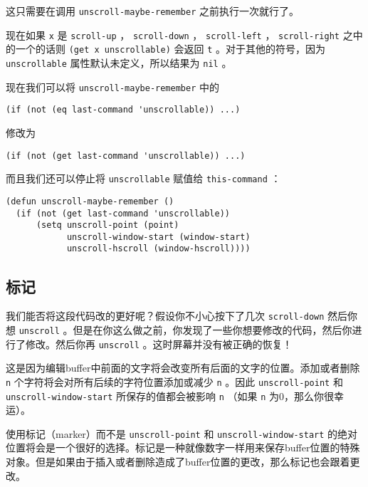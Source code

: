 这只需要在调用 \texttt{unscroll-maybe-remember} 之前执行一次就行了。

现在如果 \texttt{x} 是 \texttt{scroll-up} ， \texttt{scroll-down} ， \texttt{scroll-left} ， \texttt{scroll-right} 之中的一个的话则 \texttt{(get x unscrollable)} 会返回 \texttt{t} 。对于其他的符号，因为 \texttt{unscrollable} 属性默认未定义，所以结果为 \texttt{nil} 。

现在我们可以将 \texttt{unscroll-maybe-remember} 中的

\begin{verbatim}
(if (not (eq last-command 'unscrollable)) ...)
\end{verbatim}

修改为

\begin{verbatim}
(if (not (get last-command 'unscrollable)) ...)
\end{verbatim}

而且我们还可以停止将 \texttt{unscrollable} 赋值给 \texttt{this-command} ：

\begin{verbatim}
(defun unscroll-maybe-remember ()
  (if (not (get last-command 'unscrollable))
      (setq unscroll-point (point)
            unscroll-window-start (window-start)
            unscroll-hscroll (window-hscroll))))
\end{verbatim}

\subsection{标记}
\label{section:03-Markers}

我们能否将这段代码改的更好呢？假设你不小心按下了几次 \texttt{scroll-down} 然后你想 \texttt{unscroll} 。但是在你这么做之前，你发现了一些你想要修改的代码，然后你进行了修改。然后你再 \texttt{unscroll} 。这时屏幕并没有被正确的恢复！

这是因为编辑buffer中前面的文字将会改变所有后面的文字的位置。添加或者删除 \texttt{n} 个字符将会对所有后续的字符位置添加或减少 \texttt{n} 。因此 \texttt{unscroll-point} 和 \texttt{unscroll-window-start} 所保存的值都会被影响 \texttt{n} （如果 \texttt{n} 为0，那么你很幸运）。

使用标记（marker）而不是 \texttt{unscroll-point} 和 \texttt{unscroll-window-start} 的绝对位置将会是一个很好的选择。标记是一种就像数字一样用来保存buffer位置的特殊对象。但是如果由于插入或者删除造成了buffer位置的更改，那么标记也会跟着更改。

